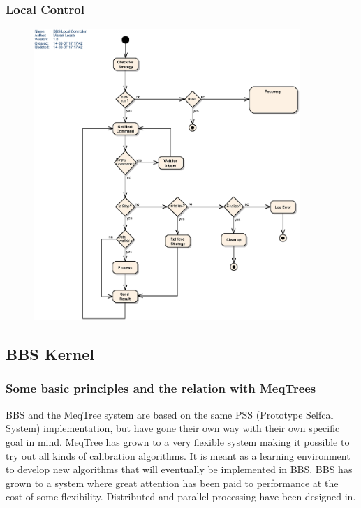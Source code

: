 \documentclass[10pt]{lofar}
\begin{document}
\subsubsection{Local Control}
\label{subsubsec:design-local-control}
\begin{figure}[!ht]
\centering
\includegraphics[width=0.9\textwidth]{images/bbs-local-control-activity-diagram}
\end{figure}


\subsection{BBS Kernel}
\label{subsec:design-kernel}
\subsubsection{Some basic principles and the relation with MeqTrees}
\label{subsubsec:design-principles}
BBS and the MeqTree system are based on the same PSS (Prototype Selfcal
System) implementation, but have gone their own way with their own specific
goal in mind. MeqTree has grown to a very flexible system making it possible
to try out all kinds of calibration algorithms. It is meant as a learning
environment to develop new algorithms that will eventually be implemented in
BBS. BBS has grown to a system where great attention has been paid to
performance at the cost of some flexibility. Distributed and parallel
processing have been designed in.
\end{document}
